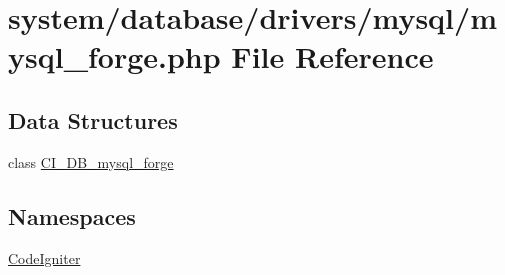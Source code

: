 \hypertarget{mysql__forge_8php}{\section{system/database/drivers/mysql/mysql\-\_\-forge.php File Reference}
\label{mysql__forge_8php}
}
\subsection*{Data Structures}
\begin{DoxyCompactItemize}
\item 
class \hyperlink{class_c_i___d_b__mysql__forge}{C\-I\-\_\-\-D\-B\-\_\-mysql\-\_\-forge}
\end{DoxyCompactItemize}
\subsection*{Namespaces}
\begin{DoxyCompactItemize}
\item 
\hyperlink{namespace_code_igniter}{Code\-Igniter}
\end{DoxyCompactItemize}
